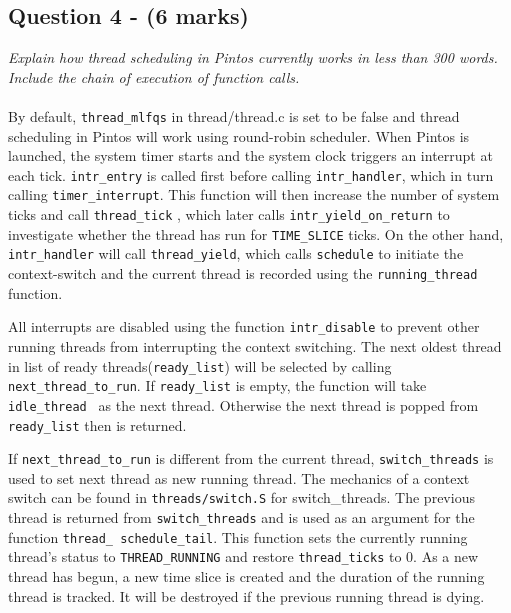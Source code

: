 \documentclass{article}
\begin{document}
\subsection*{Question 4 - (6 marks)}
\textit{Explain how thread scheduling in Pintos currently works in less than 300 words. Include the chain of execution of function calls.}
\\ \\
By default, \texttt{thread\_mlfqs} in thread/thread.c is set to be false and thread scheduling in Pintos will work using round-robin scheduler. When Pintos is launched, the system timer starts and the system clock triggers an interrupt at each tick. \texttt{intr\_entry} is called first before calling \texttt{intr\_handler}, which in turn calling \texttt{timer\_interrupt}. This function will then increase the number of system ticks and call \texttt{thread\_tick} , which later calls \texttt{intr\_yield\_on\_return} to investigate whether the thread has run for \texttt{TIME\_SLICE} ticks. On the other hand, \texttt{intr\_handler} will call \texttt{thread\_yield}, which calls \texttt{schedule} to initiate the context-switch and the current thread is recorded using the \texttt{running\_thread} function.
\par
 All interrupts are disabled using the function \texttt{intr\_disable} to prevent other running threads from interrupting the context switching.  The next oldest thread in list of ready threads(\texttt{ready\_list}) will be selected by calling \texttt{next\_thread\_to\_run}.  If \texttt{ready\_list} is empty,  the function will take \texttt{ idle\_thread } as the next thread. Otherwise the next thread is popped from \texttt{ready\_list} then is returned.
 \par
 If \texttt{next\_thread\_to\_run} is different from the current thread, \texttt{switch\_threads} is used to set next thread as new running thread. The mechanics of a context switch can be found in \texttt{threads/switch.S} for switch\_threads. The previous thread is returned from \texttt{switch\_threads} and is used as an argument for the function \texttt{thread\_
 schedule\_tail}. This function sets the currently running thread's status to \texttt{THREAD\_RUNNING} and restore \texttt{thread\_ticks} to 0. As a new thread has begun, a new time slice is created and the duration of the running thread is tracked. It will be destroyed if the previous running thread is dying.
\end{document}
